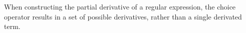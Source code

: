 When constructing the partial derivative of a regular expression, the choice
operator results in a set of possible derivatives, rather than a single
derivated term.


